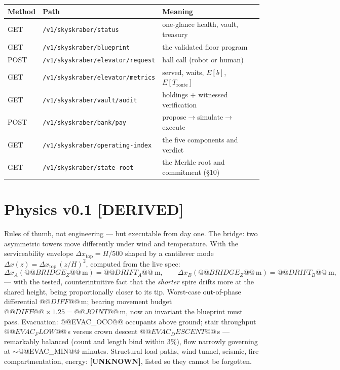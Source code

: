 \documentclass[11pt,a4paper]{article}
\newcommand{\claim}[1]{\textcolor{qsteel}{\textbf{\footnotesize[#1]}}}
\begin{document}
\begin{center}\small
\begin{tabular}{@{}lll@{}}
\toprule
Method & Path & Meaning \\
\midrule
GET & \texttt{/v1/skyskraber/status} & one-glance health, vault, treasury \\
GET & \texttt{/v1/skyskraber/blueprint} & the validated floor program \\
POST & \texttt{/v1/skyskraber/elevator/request} & hall call (robot or human) \\
GET & \texttt{/v1/skyskraber/elevator/metrics} & served, waits, $E[b]$, $E[T_{\text{route}}]$ \\
GET & \texttt{/v1/skyskraber/vault/audit} & holdings $+$ witnessed verification \\
POST & \texttt{/v1/skyskraber/bank/pay} & propose$\to$simulate$\to$execute \\
GET & \texttt{/v1/skyskraber/operating-index} & the five components and verdict \\
GET & \texttt{/v1/skyskraber/state-root} & the Merkle root and commitment (\S10) \\
\bottomrule
\end{tabular}
\end{center}

\section{Physics v0.1 \hfill \claim{DERIVED}}

Rules of thumb, not engineering --- but executable from day one. The bridge: two
asymmetric towers move differently under wind and temperature. With the
serviceability envelope $\Delta x_{\text{top}} = H/500$ shaped by a cantilever
mode $\Delta x(z) = \Delta x_{\text{top}}\,(z/H)^2$, computed from the live spec:
\[
\Delta x_A(@@BRIDGE_Z@@\,\text{m}) = @@DRIFT_A@@\ \text{m}, \qquad
\Delta x_B(@@BRIDGE_Z@@\,\text{m}) = @@DRIFT_B@@\ \text{m},
\]
--- with the tested, counterintuitive fact that the \emph{shorter} spire drifts
more at the shared height, being proportionally closer to its tip. Worst-case
out-of-phase differential $@@DIFF@@$\,m; bearing movement budget
$@@DIFF@@ \times 1.25 = @@JOINT@@$\,m, now an invariant the blueprint must pass.
Evacuation: @@EVAC_OCC@@ occupants above ground; stair throughput
$@@EVAC_FLOW@@$\,s versus crown descent $@@EVAC_DESCENT@@$\,s --- remarkably
balanced (count and length bind within 3\%), flow narrowly governing at
$\sim$@@EVAC_MIN@@ minutes. Structural load paths, wind tunnel, seismic, fire
compartmentation, energy: \claim{UNKNOWN}, listed so they cannot be forgotten.
\end{document}
